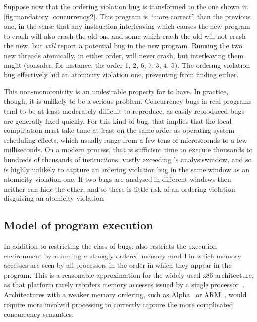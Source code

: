 Suppose now that the ordering violation bug is transformed to the one
shown in \autoref{fig:mandatory_concurrency2}.  This program is ``more
correct'' than the previous one, in the sense that any instruction
interleaving which causes the new program to crash will also crash the
old one and some which crash the old will not crash the new, but
{\technique} \emph{will} report a potential bug in the new program.
Running the two new threads atomically, in either order, will never
crash, but interleaving them might (consider, for instance, the order
1, 2, 6, 7, 3, 4, 5).  The ordering violation bug effectively hid an
atomicity violation one, preventing {\technique} from finding either.

This non-monotonicity is an undesirable property for {\technique} to
have.  In practice, though, it is unlikely to be a serious problem.
Concurrency bugs in real programs tend to be at least moderately
difficult to reproduce, as easily reproduced bugs are generally fixed
quickly.  For this kind of bug, that implies that the local
computation must take time at least on the same order as operating
system scheduling effects, which usually range from a few tens of
microseconds to a few milliseconds.  On a modern process, that is
sufficient time to execute thousands to hundreds of thousands of
instructions, vastly exceeding {\technique}'s \gls{analysiswindow},
and so {\technique} is highly unlikely to capture an ordering
violation bug in the same window as an atomicity violation one.  If
two bugs are analysed in different windows then neither can hide the
other, and so there is little risk of an ordering violation disguising
an atomicity violation.

\subsection{Model of program execution}

In addition to restricting the class of bugs, {\technique} also
restricts the execution environment by assuming a strongly-ordered
memory model in which memory accesses are seen by all processors in
the order in which they appear in the program.  This is a reasonable
approximation for the widely-used x86 architecture, as that platform
rarely reorders memory accesses issued by a single
processor~\cite[Section 8.2]{Intel2009}.  Architectures with a weaker
memory ordering, such as Alpha~\cite[Section 5.6]{FFFCompaq2002} or
ARM~\cite[Section 5.3.4]{FFFARM2007}, would require more involved
processing to correctly capture the more complicated concurrency
semantics.

